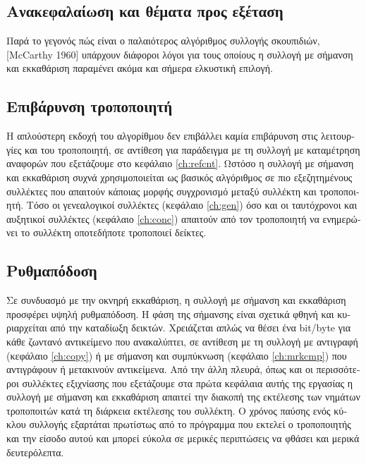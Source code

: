 \begin{greek}
\section{Ανακεφαλαίωση και θέματα προς εξέταση}
Παρά το γεγονός πώς είναι ο παλαιότερος αλγόριθμος συλλογής
σκουπιδιών, [McCarthy 1960] υπάρχουν διάφοροι λόγοι για τους 
οποίους η συλλογή με σήμανση και εκκαθάριση παραμένει ακόμα και
σήμερα ελκυστική επιλογή.

\subsection{Επιβάρυνση τροποποιητή}
Η απλούστερη εκδοχή του αλγορίθμου δεν επιβάλλει καμία επιβάρυνση
στις λειτουργίες  και  του 
τροποποιητή, σε αντίθεση για παράδειγμα με τη συλλογή με καταμέτρηση
αναφορών που εξετάζουμε στο κεφάλαιο \ref{ch:refcnt}.
Ωστόσο η συλλογή με σήμανση και εκκαθάριση συχνά χρησιμοποιείται
ως βασικός αλγόριθμος σε πιο εξεζητημένους συλλέκτες που απαιτούν
κάποιας μορφής συγχρονισμό μεταξύ συλλέκτη και τροποποιητή. Τόσο
οι γενεαλογικοί συλλέκτες (κεφάλαιο \ref{ch:gen}) όσο και
οι ταυτόχρονοι και αυξητικοί συλλέκτες (κεφάλαιο \ref{ch:conc})
απαιτούν από τον τροποποιητή να ενημερώνει το συλλέκτη οποτεδήποτε
τροποποιεί δείκτες.

\subsection{Ρυθμαπόδοση}
Σε συνδυασμό με την οκνηρή εκκαθάριση, η συλλογή με σήμανση και
εκκαθάριση προσφέρει υψηλή ρυθμαπόδοση. Η φάση της σήμανσης είναι
σχετικά φθηνή και κυριαρχείται από την καταδίωξη δεικτών. Χρειάζεται
απλώς να θέσει ένα bit/byte για κάθε ζωντανό αντικείμενο που
ανακαλύπτει, σε αντίθεση με τη συλλογή με αντιγραφή (κεφάλαιο
\ref{ch:copy}) ή με σήμανση και συμπύκνωση (κεφάλαιο \ref{ch:mrkcmp}) 
που αντιγράφουν ή μετακινούν αντικείμενα. Από την άλλη πλευρά, 
όπως και οι περισσότεροι συλλέκτες εξιχνίασης που εξετάζουμε
στα πρώτα κεφάλαια αυτής της εργασίας η συλλογή με σήμανση και
εκκαθάριση απαιτεί την διακοπή της εκτέλεσης των νημάτων τροποποιτών
κατά τη διάρκεια εκτέλεσης του συλλέκτη. Ο χρόνος παύσης ενός
κύκλου συλλογής εξαρτάται πρωτίστως από το πρόγραμμα που εκτελεί
ο τροποποιητής και την είσοδο αυτού και μπορεί εύκολα σε μερικές
περιπτώσεις να φθάσει και μερικά δευτερόλεπτα.


\end{greek}
